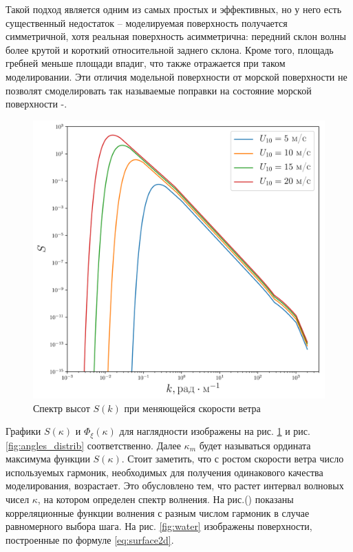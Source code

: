 \documentclass[a4paper,14pt]{extarticle}
\begin{document}
Такой подход является одним из самых простых и эффективных, но у
него есть существенный недостаток – моделируемая поверхность получается симметричной, хотя реальная поверхность асимметрична: передний склон
волны более крутой и короткий относительной заднего склона.
Кроме того, площадь гребней меньше площади впадиг, что также отражается при
таком моделировании. Эти отличия модельной поверхности от морской поверхности
не позволят смоделировать так называемые поправки на состояние морской
поверхности \cite{cite:12}-\cite{cite:13}. 
\begin{figure}[ht]
        \centering
        \includegraphics[width=0.6\linewidth]{fig/full_spectrum1.png}
        \caption{Спектр высот $S(k)$ при меняющейся скорости ветра}
        \label{fig:spectrum_heights}
\end{figure}

Графики $S(\kappa)$ и  $\Phi_\xi(\kappa)$ для наглядности изображены на рис.
\ref{fig:spectrum_heights} и рис. \ref{fig:angles_distrib} соответственно.
Далее $\kappa_m$ будет называться ордината максимума функции  $S(\kappa)$. Стоит
заметить, что с ростом скорости ветра число используемых гармоник, необходимых
для получения одинакового качества моделирования,
возрастает. 
Это обусловлено тем, что растет интервал волновых чисел $\kappa$, на котором
определен спектр волнения. На рис.() показаны корреляционные функции волнения с
разным числом гармоник в случае равномерного выбора шага. 
На рис. \ref{fig:water} изображены поверхности,
построенные по формуле \eqref{eq:surface2d}.


\end{document}
